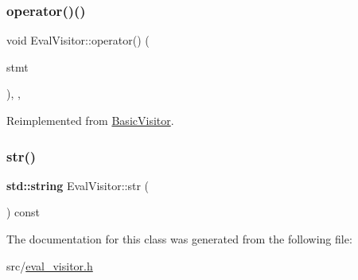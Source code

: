 \subsubsection{\texorpdfstring{operator()()}{operator()()}\hspace{0.1cm}{\footnotesize\ttfamily [2/2]}}
{\footnotesize\ttfamily void Eval\+Visitor\+::operator() (\begin{DoxyParamCaption}\item[{const \hyperlink{struct_expression_statement}{Expression\+Statement} \&}]{stmt }\end{DoxyParamCaption})\hspace{0.3cm}{\ttfamily [inline]}, {\ttfamily [override]}, {\ttfamily [virtual]}}



Reimplemented from \hyperlink{struct_basic_visitor_a6c369f60a28dffd5149258e32a81cb6e}{Basic\+Visitor}.

\mbox{\label{class_eval_visitor_a999cfe6d55d85b27a6dca7c5f8c2b07e}} 
\subsubsection{\texorpdfstring{str()}{str()}}
{\footnotesize\ttfamily \textbf{ std\+::string} Eval\+Visitor\+::str (\begin{DoxyParamCaption}{ }\end{DoxyParamCaption}) const\hspace{0.3cm}{\ttfamily [inline]}}



The documentation for this class was generated from the following file\+:\begin{DoxyCompactItemize}
\item 
src/\hyperlink{eval__visitor_8h}{eval\+\_\+visitor.\+h}\end{DoxyCompactItemize}

